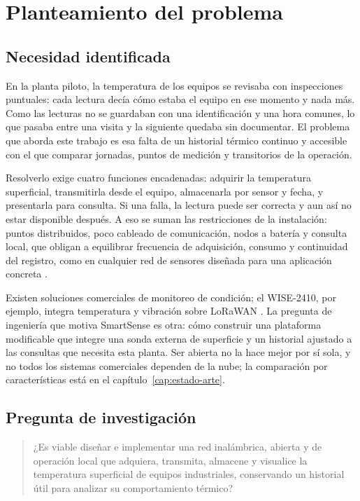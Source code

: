 \chapter{Planteamiento del problema}
\label{cap:problema}

\section{Necesidad identificada}
En la planta piloto, la temperatura de los equipos se revisaba con inspecciones puntuales: cada lectura decía cómo estaba el equipo en ese momento y nada más. Como las lecturas no se guardaban con una identificación y una hora comunes, lo que pasaba entre una visita y la siguiente quedaba sin documentar. El problema que aborda este trabajo es esa falta de un historial térmico continuo y accesible con el que comparar jornadas, puntos de medición y transitorios de la operación.

Resolverlo exige cuatro funciones encadenadas: adquirir la temperatura superficial, transmitirla desde el equipo, almacenarla por sensor y fecha, y presentarla para consulta. Si una falla, la lectura puede ser correcta y aun así no estar disponible después. A eso se suman las restricciones de la instalación: puntos distribuidos, poco cableado de comunicación, nodos a batería y consulta local, que obligan a equilibrar frecuencia de adquisición, consumo y continuidad del registro, como en cualquier red de sensores diseñada para una aplicación concreta \citep{yick2008}.

Existen soluciones comerciales de monitoreo de condición; el WISE-2410, por ejemplo, integra temperatura y vibración sobre LoRaWAN \citep{wise2410}. La pregunta de ingeniería que motiva SmartSense es otra: cómo construir una plataforma modificable que integre una sonda externa de superficie y un historial ajustado a las consultas que necesita esta planta. Ser abierta no la hace mejor por sí sola, y no todos los sistemas comerciales dependen de la nube; la comparación por características está en el capítulo~\ref{cap:estado-arte}.

\section{Pregunta de investigación}
\begin{quote}
¿Es viable diseñar e implementar una red inalámbrica, abierta y de operación local que adquiera, transmita, almacene y visualice la temperatura superficial de equipos industriales, conservando un historial útil para analizar su comportamiento térmico?
\end{quote}

